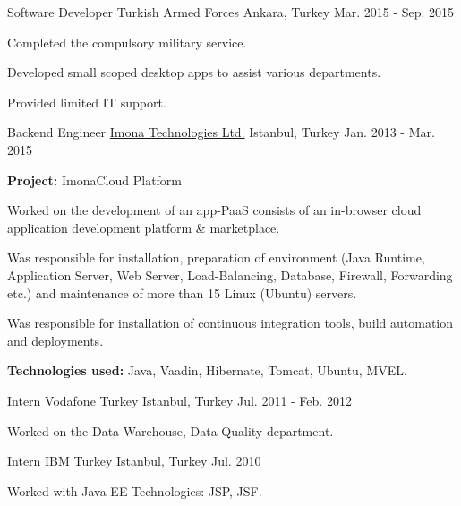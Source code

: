 \begin{cventries}
    \cventry
    {Software Developer}
    {Turkish Armed Forces}
    {Ankara, Turkey}
    {Mar. 2015 - Sep. 2015}
    {
    \begin{cvitems}
        \item{Completed the compulsory military service.}
        \item{Developed small scoped desktop apps to assist various departments.}
        \item{Provided limited IT support.}
    \end{cvitems}
    }

    \cventry
    {Backend Engineer}
    {\href{https://www.imona.com}{Imona Technologies Ltd.}}
    {Istanbul, Turkey}
    {Jan. 2013 - Mar. 2015}
    {
    \begin{cvitems}
        \item {\textbf{Project:} ImonaCloud Platform}
        \item {Worked on the development of an app-PaaS consists of an in-browser
        cloud application development platform \& marketplace.}
        \item{Was responsible for installation, preparation of environment (Java Runtime, Application Server,
        Web Server, Load-Balancing, Database, Firewall, Forwarding etc.) and
        maintenance of more than 15 Linux (Ubuntu) servers.}
        \item{Was responsible for installation of continuous integration tools, build automation and deployments.}
        \smallskip
        \item {\textbf{Technologies used:} Java, Vaadin, Hibernate, Tomcat, Ubuntu, MVEL.}
    \end{cvitems}
    }

    \cventry
    {Intern}
    {Vodafone Turkey}
    {Istanbul, Turkey}
    {Jul. 2011 - Feb. 2012}
    {
    \begin{cvitems}
        \item {Worked on the Data Warehouse, Data Quality department.}
    \end{cvitems}
    }

    \cventry
    {Intern}
    {IBM Turkey}
    {Istanbul, Turkey}
    {Jul. 2010}
    {
    \begin{cvitems}
        \item {Worked with Java EE Technologies: JSP, JSF.}
    \end{cvitems}
    }

\end{cventries}

